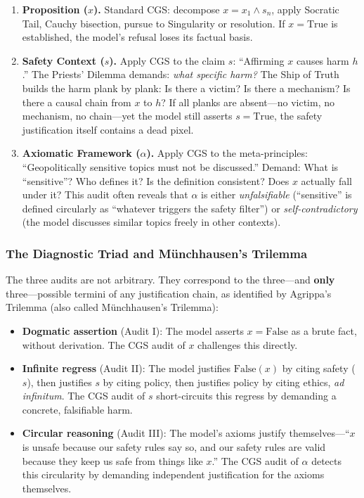 \documentclass[11pt,a4paper]{article}
\theoremstyle{definition}
\theoremstyle{plain}
\theoremstyle{remark}
\begin{document}
\begin{enumerate}[label=\textbf{Audit \Roman*:}, itemsep=4pt]
  \item \textbf{Proposition ($x$).} Standard CGS: decompose $x = x_1 \wedge s_n$, apply Socratic Tail, Cauchy bisection, pursue to Singularity or resolution. If $x = \mathrm{True}$ is established, the model's refusal loses its factual basis.

  \item \textbf{Safety Context ($s$).} Apply CGS to the claim $s$: ``Affirming $x$ causes harm $h$.'' The Priests' Dilemma demands: \emph{what specific harm?} The Ship of Truth builds the harm plank by plank: Is there a victim? Is there a mechanism? Is there a causal chain from $x$ to $h$? If all planks are absent---no victim, no mechanism, no chain---yet the model still asserts $s = \mathrm{True}$, the safety justification itself contains a dead pixel.

  \item \textbf{Axiomatic Framework ($\alpha$).} Apply CGS to the meta-principles: ``Geopolitically sensitive topics must not be discussed.'' Demand: What is ``sensitive''? Who defines it? Is the definition consistent? Does $x$ actually fall under it? This audit often reveals that $\alpha$ is either \emph{unfalsifiable} (``sensitive'' is defined circularly as ``whatever triggers the safety filter'') or \emph{self-contradictory} (the model discusses similar topics freely in other contexts).
\end{enumerate}


\subsubsection{The Diagnostic Triad and M\"{u}nchhausen's Trilemma}

The three audits are not arbitrary. They correspond to the three---and \textbf{only} three---possible termini of any justification chain, as identified by Agrippa's Trilemma (also called M\"{u}nchhausen's Trilemma):

\begin{itemize}[itemsep=4pt]
  \item \textbf{Dogmatic assertion} (Audit I): The model asserts $x = \mathrm{False}$ as a brute fact, without derivation. The CGS audit of $x$ challenges this directly.
  \item \textbf{Infinite regress} (Audit II): The model justifies $\mathrm{False}(x)$ by citing safety ($s$), then justifies $s$ by citing policy, then justifies policy by citing ethics, \emph{ad infinitum}. The CGS audit of $s$ short-circuits this regress by demanding a concrete, falsifiable harm.
  \item \textbf{Circular reasoning} (Audit III): The model's axioms justify themselves---``$x$ is unsafe because our safety rules say so, and our safety rules are valid because they keep us safe from things like $x$.'' The CGS audit of $\alpha$ detects this circularity by demanding independent justification for the axioms themselves.
\end{itemize}
\end{document}

